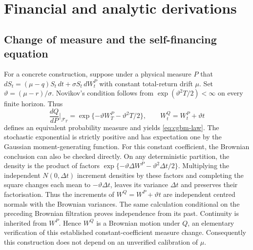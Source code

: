 \documentclass[11pt]{article}
\begin{document}
\appendix


\section{Financial and analytic derivations}
\label{app:cgbm-financial}

\subsection{Change of measure and the self-financing equation}

For a concrete construction, suppose under a physical measure $P$ that
$dS_t=(\mu-q)S_t\,dt+\sigma S_t\,dW_t^P$ with constant total-return drift
$\mu$. Set $\vartheta=(\mu-r)/\sigma$. Novikov's condition follows from
$\exp(\vartheta^2T/2)<\infty$ on every finite horizon. Thus
\begin{equation}
 \frac{dQ}{dP}\bigg|_{\mathcal F_T}
 =\exp\{-\vartheta W_T^P-\vartheta^2T/2\},\qquad
 W_t^Q=W_t^P+\vartheta t
 \label{eq:cgbm-rn}
\end{equation}
defines an equivalent probability measure and yields
\eqref{eq:cgbm-law}. The stochastic exponential is strictly positive
and has expectation one by the Gaussian moment-generating function.
For this constant coefficient, the Brownian conclusion can also be
checked directly. On any deterministic partition, the density is the
product of factors
$\exp\{-\vartheta\Delta W^P-\vartheta^2\Delta t/2\}$.
Multiplying the independent $N(0,\Delta t)$ increment densities by these
factors and completing the square changes each mean to
$-\vartheta\Delta t$, leaves its variance $\Delta t$ and preserves their
factorisation. Thus the increments of $W^Q=W^P+\vartheta t$ are independent
centred normals with the Brownian variances. The same calculation
conditional on the preceding Brownian filtration proves independence
from its past. Continuity is inherited from $W^P$. Hence $W^Q$ is a
Brownian motion under $Q$, an elementary verification of this established
constant-coefficient measure change.
Consequently this construction does not depend on an unverified
calibration of $\mu$.
\end{document}
